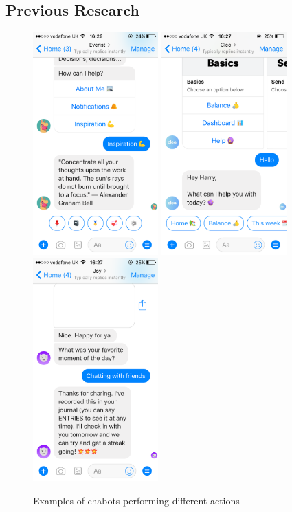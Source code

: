 \subsection{Previous Research}


\begin{figure}[ht]
  \centering
  \includegraphics[width=1.9in]{../resources/everist.png}
  \hspace{10px}
  \includegraphics[width=1.9in]{../resources/cleo.png}
  \hspace{10px}
  \includegraphics[width=1.9in]{../resources/joy-ai.png}
  \caption{Examples of chabots performing different actions}
  \label{fig:chatbots_examples}
\end{figure}

